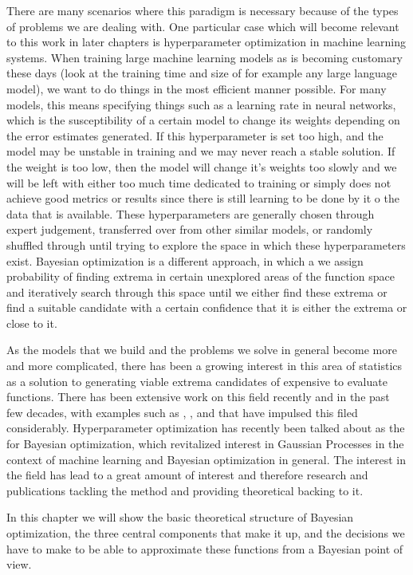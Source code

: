 There are many scenarios where this paradigm is necessary because of the types of problems we are dealing with. One particular case which will become relevant to this work in later chapters is hyperparameter optimization in machine learning systems. When training large machine learning models as is becoming customary these days (look at the training time and size of for example any large language model), we want to do things in the most efficient manner possible. For many models, this means specifying things such as a learning rate in neural networks, which is the susceptibility of a certain model to change its weights depending on the error estimates generated. If this hyperparameter is set too high, and the model may be unstable in training and we may never reach a stable solution. If the weight is too low, then the model will change it's weights too slowly and we will be left with either too much time dedicated to training or simply does not achieve good metrics or results since there is still learning to be done by it o the data that is available. These hyperparameters are generally chosen through expert judgement, transferred over from other similar models, or randomly shuffled through until trying to explore the space in which these hyperparameters exist. Bayesian optimization is a different approach, in which a we assign probability of finding extrema in certain unexplored areas of the function space and iteratively search through this space until we either find these extrema or find a suitable candidate with a certain confidence that it is either the extrema or close to it. 

As the models that we build and the problems we solve in general become more and more complicated, there has been a growing interest in this area of statistics as a solution to generating viable extrema candidates of expensive to evaluate functions. There has been extensive work on this field recently and in the past few decades, with examples such as \cite{bergstra2013hyperopt}, \cite{balandat2020botorch}, and \cite{akiba2019optuna} that have impulsed this filed considerably. Hyperparameter optimization has recently been talked about as the  for Bayesian optimization, which revitalized interest in Gaussian Processes in the context of machine learning and Bayesian optimization in general. The interest in the field has lead to a great amount of interest and therefore research and publications tackling the method and providing theoretical backing to it. 

In this chapter we will show the basic theoretical structure of Bayesian optimization, the three central components that make it up, and the decisions we have to make to be able to approximate these functions from a Bayesian point of view. 

